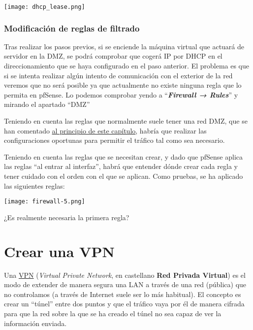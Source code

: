 \begin{center}
    \vspace{-10pt}
    \texttt{[image: dhcp\_lease.png]}
    \vspace{-20pt}
\end{center}


\subsection{Modificación de reglas de filtrado}
Tras realizar los pasos previos, si se enciende la máquina virtual que actuará de servidor en la DMZ, se podrá comprobar que cogerá IP por DHCP en el direccionamiento que se haya configurado en el paso anterior. El problema es que si se intenta realizar algún intento de comunicación con el exterior de la red veremos que no será posible ya que actualmente no existe ninguna regla que lo permita en pfSense. Lo podemos comprobar yendo a “\textit{\textbf{Firewall → Rules}}” y mirando el apartado “DMZ”


Teniendo en cuenta las reglas que normalmente suele tener una red DMZ, que se han comentado \href{crear_una_nueva_red}{al principio de este capítulo}, habría que realizar las configuraciones oportunas para permitir el tráfico tal como sea necesario.

Teniendo en cuenta las reglas que se necesitan crear, y dado que pfSense aplica las reglas “al entrar al interfaz”, habrá que entender dónde crear cada regla y tener cuidado con el orden con el que se aplican. Como pruebas, se ha aplicado las siguientes reglas:

\begin{center}
    \vspace{-15pt}
    \texttt{[image: firewall-5.png]}
    \vspace{-20pt}
\end{center}

¿Es realmente necesaria la primera regla?


\chapter{Crear una VPN}
Una \href{https://es.wikipedia.org/wiki/Red_privada_virtual}{VPN} (\textit{Virtual Private Network}, en castellano \textbf{Red Privada Virtual}) es el modo de extender de manera segura una LAN a través de una red (pública) que no controlamos (a través de Internet suele ser lo más habitual). El concepto es crear un “túnel” entre dos puntos y que el tráfico vaya por él de manera cifrada para que la red sobre la que se ha creado el túnel no sea capaz de ver la información enviada.


